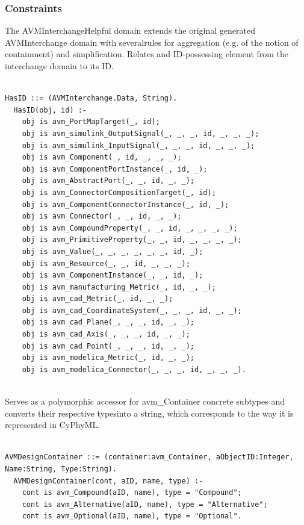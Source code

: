 \subsubsection{Constraints}


The AVMInterchangeHelpful domain extends the original generated AVMInterchange domain with severalrules for aggregation (e.g. of the notion of containment) and simplification.
Relates and ID-possessing element from the interchange domain to its ID.
\begin{lstlisting}

HasID ::= (AVMInterchange.Data, String).
  HasID(obj, id) :-
    obj is avm_PortMapTarget(_, id);
    obj is avm_simulink_OutputSignal(_, _, _, id, _, _, _);
    obj is avm_simulink_InputSignal(_, _, _, id, _, _, _);
    obj is avm_Component(_, id, _, _, _);
    obj is avm_ComponentPortInstance(_, id, _);
    obj is avm_AbstractPort(_, _, id, _, _);
    obj is avm_ConnectorCompositionTarget(_, id);
    obj is avm_ComponentConnectorInstance(_, id, _);
    obj is avm_Connector(_, _, id, _, _);
    obj is avm_CompoundProperty(_, _, id, _, _, _, _);
    obj is avm_PrimitiveProperty(_, _, id, _, _, _, _);
    obj is avm_Value(_, _, _, _, _, _, id, _);
    obj is avm_Resource(_, _, id, _, _, _);
    obj is avm_ComponentInstance(_, _, id, _);
    obj is avm_manufacturing_Metric(_, id, _, _);
    obj is avm_cad_Metric(_, id, _, _);
    obj is avm_cad_CoordinateSystem(_, _, _, id, _, _);
    obj is avm_cad_Plane(_, _, _, id, _, _);
    obj is avm_cad_Axis(_, _, _, id, _, _);
    obj is avm_cad_Point(_, _, _, id, _, _);
    obj is avm_modelica_Metric(_, id, _, _);
    obj is avm_modelica_Connector(_, _, _, id, _, _, _).


\end{lstlisting}

Serves as a polymorphic accessor for avm\_Container concrete subtypes and converts their respective typesinto a string, which corresponds to the way it is represented in CyPhyML.
\begin{lstlisting}

AVMDesignContainer ::= (container:avm_Container, aObjectID:Integer, Name:String, Type:String).
  AVMDesignContainer(cont, aID, name, type) :-
    cont is avm_Compound(aID, name), type = "Compound";
    cont is avm_Alternative(aID, name), type = "Alternative";
    cont is avm_Optional(aID, name), type = "Optional".


\end{lstlisting}


